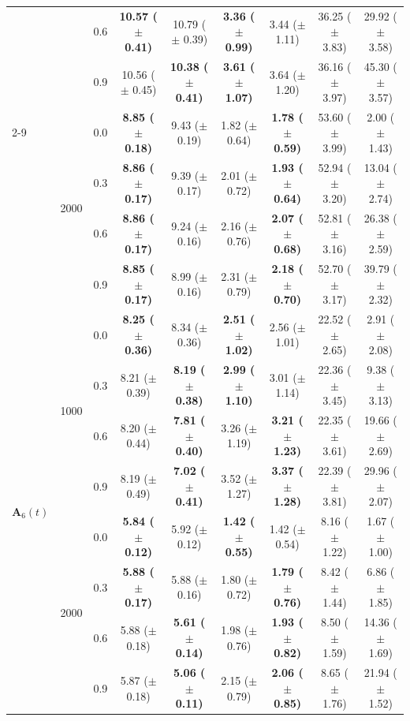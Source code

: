 \begin{table}[htbp]
{\begin{tabular}{lll|cc|cc|cc}
 &  & 0.6 & \textbf{10.57 ($\pm$ 0.41)} & 10.79 ($\pm$ 0.39) & \textbf{3.36 ($\pm$ 0.99)} & 3.44 ($\pm$ 1.11) & 36.25 ($\pm$ 3.83) & 29.92 ($\pm$ 3.58) \\
 &  & 0.9 & 10.56 ($\pm$ 0.45) & \textbf{10.38 ($\pm$ 0.41)} & \textbf{3.61 ($\pm$ 1.07)} & 3.64 ($\pm$ 1.20) & 36.16 ($\pm$ 3.97) & 45.30 ($\pm$ 3.57) \\
\cline{2-9}
 & \multirow{4}{*}{2000} & 0.0 & \textbf{8.85 ($\pm$ 0.18)} & 9.43 ($\pm$ 0.19) & 1.82 ($\pm$ 0.64) & \textbf{1.78 ($\pm$ 0.59)} & 53.60 ($\pm$ 3.99) & 2.00 ($\pm$ 1.43) \\
 &  & 0.3 & \textbf{8.86 ($\pm$ 0.17)} & 9.39 ($\pm$ 0.17) & 2.01 ($\pm$ 0.72) & \textbf{1.93 ($\pm$ 0.64)} & 52.94 ($\pm$ 3.20) & 13.04 ($\pm$ 2.74) \\
 &  & 0.6 & \textbf{8.86 ($\pm$ 0.17)} & 9.24 ($\pm$ 0.16) & 2.16 ($\pm$ 0.76) & \textbf{2.07 ($\pm$ 0.68)} & 52.81 ($\pm$ 3.16) & 26.38 ($\pm$ 2.59) \\
 &  & 0.9 & \textbf{8.85 ($\pm$ 0.17)} & 8.99 ($\pm$ 0.16) & 2.31 ($\pm$ 0.79) & \textbf{2.18 ($\pm$ 0.70)} & 52.70 ($\pm$ 3.17) & 39.79 ($\pm$ 2.32) \\
\hline
\multirow{8}{*}{$\mathbf{A}_6(t)$} & \multirow{4}{*}{1000} & 0.0 & \textbf{8.25 ($\pm$ 0.36)} & 8.34 ($\pm$ 0.36) & \textbf{2.51 ($\pm$ 1.02)} & 2.56 ($\pm$ 1.01) & 22.52 ($\pm$ 2.65) & 2.91 ($\pm$ 2.08) \\
 &  & 0.3 & 8.21 ($\pm$ 0.39) & \textbf{8.19 ($\pm$ 0.38)} & \textbf{2.99 ($\pm$ 1.10)} & 3.01 ($\pm$ 1.14) & 22.36 ($\pm$ 3.45) & 9.38 ($\pm$ 3.13) \\
 &  & 0.6 & 8.20 ($\pm$ 0.44) & \textbf{7.81 ($\pm$ 0.40)} & 3.26 ($\pm$ 1.19) & \textbf{3.21 ($\pm$ 1.23)} & 22.35 ($\pm$ 3.61) & 19.66 ($\pm$ 2.69) \\
 &  & 0.9 & 8.19 ($\pm$ 0.49) & \textbf{7.02 ($\pm$ 0.41)} & 3.52 ($\pm$ 1.27) & \textbf{3.37 ($\pm$ 1.28)} & 22.39 ($\pm$ 3.81) & 29.96 ($\pm$ 2.07) \\
\cline{2-9}
 & \multirow{4}{*}{2000} & 0.0 & \textbf{5.84 ($\pm$ 0.12)} & 5.92 ($\pm$ 0.12) & \textbf{1.42 ($\pm$ 0.55)} & 1.42 ($\pm$ 0.54) & 8.16 ($\pm$ 1.22) & 1.67 ($\pm$ 1.00) \\
 &  & 0.3 & \textbf{5.88 ($\pm$ 0.17)} & 5.88 ($\pm$ 0.16) & 1.80 ($\pm$ 0.72) & \textbf{1.79 ($\pm$ 0.76)} & 8.42 ($\pm$ 1.44) & 6.86 ($\pm$ 1.85) \\
 &  & 0.6 & 5.88 ($\pm$ 0.18) & \textbf{5.61 ($\pm$ 0.14)} & 1.98 ($\pm$ 0.76) & \textbf{1.93 ($\pm$ 0.82)} & 8.50 ($\pm$ 1.59) & 14.36 ($\pm$ 1.69) \\
 &  & 0.9 & 5.87 ($\pm$ 0.18) & \textbf{5.06 ($\pm$ 0.11)} & 2.15 ($\pm$ 0.79) & \textbf{2.06 ($\pm$ 0.85)} & 8.65 ($\pm$ 1.76) & 21.94 ($\pm$ 1.52) \\
\hline
\end{tabular}%
}
\end{table}

